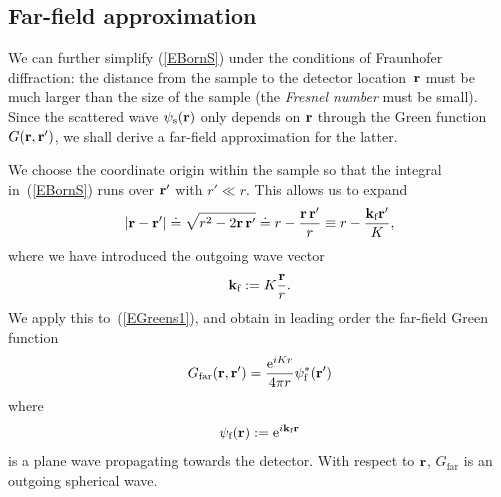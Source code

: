 %

\subsection{Far-field approximation}

%

We can further simplify (\ref{EBornS})
under the conditions of Fraunhofer diffraction:
%
the distance from the sample to the detector location~$\mathbf{r}$
must be much larger than the size of the sample
(the \textit{Fresnel number}
%
must be small).
Since the scattered wave $\psi_\text{s}(\mathbf{r})$
only depends on $\mathbf{r}$ through the Green function~$G(\mathbf{r},\mathbf{r}')$,
we shall derive a far-field approximation for the latter.

We choose the coordinate origin within the sample
so that the integral in~(\ref{EBornS}) runs over $\mathbf{r}'$ with $r'\ll r$.
This allows us to expand
\begin{equation}
  \left|\mathbf{r}-\mathbf{r}'\right|
  \doteq \sqrt{r^2-2\mathbf{r}\,\mathbf{r}'}
  \doteq r - \frac{\mathbf{r}\,\mathbf{r}'}{r}
  \equiv r - \frac{\mathbf{k}_{\text{f}} \mathbf{r}'}{K},
\end{equation}
%
where we have introduced the outgoing wave vector
\begin{equation}
  \mathbf{k}_{\text{f}}:=K\frac{\mathbf{r}}{r}.
\end{equation}
We apply this to~(\ref{EGreens1}),
%
and obtain in leading order the far-field Green function
\begin{equation}\label{EGreenFar}
  G_\text{far}(\mathbf{r},\mathbf{r}')
  = \frac{\text{e}^{iKr}}{4\pi r}\psi^*_{\text{f}}(\mathbf{r}')
\end{equation}
where
\begin{equation}
  \psi_{\text{f}}(\mathbf{r}) := \text{e}^{i\mathbf{k}_{\text{f}} \mathbf{r}}
\end{equation}
%
is a plane wave propagating towards the detector.
With respect to $\mathbf{r}$, $G_\text{far}$ is an outgoing spherical wave.

